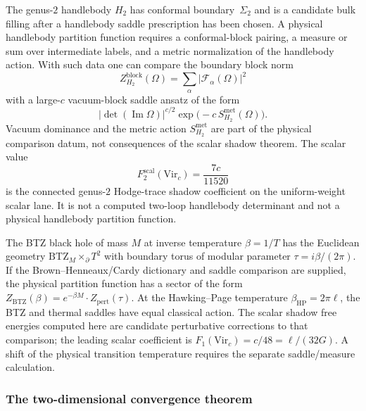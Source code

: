 \begin{example}
The genus-$2$ handlebody $H_2$ has conformal boundary~$\Sigma_2$ and
is a candidate bulk filling after a handlebody saddle prescription has
been chosen.  A physical handlebody partition function requires a
conformal-block pairing, a measure or sum over intermediate labels,
and a metric normalization of the handlebody action.  With such data
one can compare the boundary block norm
\[
Z^{\mathrm{block}}_{H_2}(\Omega)
=
\sum_{\alpha} |\mathcal F_\alpha(\Omega)|^2
\]
with a large-\(c\) vacuum-block saddle ansatz of the form
\[
|\det(\operatorname{Im}\Omega)|^{c/2}
\exp\!\bigl(-c\,S_{H_2}^{\mathrm{met}}(\Omega)\bigr).
\]
Vacuum dominance and the metric action \(S_{H_2}^{\mathrm{met}}\) are
part of the physical comparison datum, not consequences of the scalar
shadow theorem.  The scalar value
\[
F_2^{\mathrm{scal}}(\mathrm{Vir}_c)
=\frac{7c}{11520}
\]
is the connected genus-$2$ Hodge-trace shadow coefficient on the
uniform-weight scalar lane.  It is not a computed two-loop handlebody
determinant and not a physical handlebody partition function.
\end{example}

\begin{example}
The BTZ black hole of mass $M$ at inverse temperature $\beta = 1/T$ has the Euclidean geometry $\mathrm{BTZ}_M \times_\partial T^2$ with boundary torus of modular parameter $\tau = i\beta/(2\pi)$. If the Brown--Henneaux/Cardy dictionary and saddle comparison are supplied, the physical partition function has a sector of the form $Z_{\mathrm{BTZ}}(\beta) = e^{-\beta M} \cdot Z_{\mathrm{pert}}(\tau)$. At the Hawking--Page temperature $\beta_{\mathrm{HP}} = 2\pi \ell$, the BTZ and thermal saddles have equal classical action. The scalar shadow free energies computed here are candidate perturbative corrections to that comparison; the leading scalar coefficient is $F_1(\mathrm{Vir}_c) = c/48 = \ell/(32G)$. A shift of the physical transition temperature requires the separate saddle/measure calculation.
\end{example}

\subsubsection{The two-dimensional convergence theorem}

